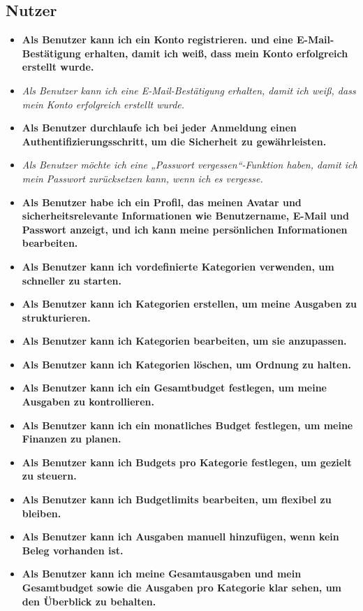 \documentclass[12pt,a4paper]{article}
\newcommand{\doing}[1]{\textbf{{#1}}}
\newcommand{\maybe}[1]{\textit{\textcolor{MaybeColor}{#1}}}
\begin{document}
\subsection{Nutzer}
\begin{itemize}
    \item \doing {Als Benutzer kann ich ein Konto registrieren. und eine E-Mail-Bestätigung erhalten, damit ich weiß, dass mein Konto erfolgreich erstellt wurde.}
    \item \maybe {Als Benutzer kann ich eine E-Mail-Bestätigung erhalten, damit ich weiß, dass mein Konto erfolgreich erstellt wurde.}
    \item \doing {Als Benutzer durchlaufe ich bei jeder Anmeldung einen Authentifizierungsschritt, um die Sicherheit zu gewährleisten.}
    \item \maybe {Als Benutzer möchte ich eine „Passwort vergessen“-Funktion haben, damit ich mein Passwort zurücksetzen kann, wenn ich es vergesse.}
    \item \doing {Als Benutzer habe ich ein Profil, das meinen Avatar und sicherheitsrelevante Informationen wie Benutzername, E-Mail und Passwort anzeigt, und ich kann meine persönlichen Informationen bearbeiten.}
    \item \doing {Als Benutzer kann ich vordefinierte Kategorien verwenden, um schneller zu starten.}
    \item \doing {Als Benutzer kann ich Kategorien erstellen, um meine Ausgaben zu strukturieren.}
    \item \doing {Als Benutzer kann ich Kategorien bearbeiten, um sie anzupassen.}
    \item \doing {Als Benutzer kann ich Kategorien löschen, um Ordnung zu halten.}
    \item \doing {Als Benutzer kann ich ein Gesamtbudget festlegen, um meine Ausgaben zu kontrollieren.}
    \item \doing {Als Benutzer kann ich ein monatliches Budget festlegen, um meine Finanzen zu planen.}
    \item \doing {Als Benutzer kann ich Budgets pro Kategorie festlegen, um gezielt zu steuern.}
    \item \doing {Als Benutzer kann ich Budgetlimits bearbeiten, um flexibel zu bleiben.}
    \item \doing {Als Benutzer kann ich Ausgaben manuell hinzufügen, wenn kein Beleg vorhanden ist.}
    \item \doing {Als Benutzer kann ich meine Gesamtausgaben und mein Gesamtbudget sowie die Ausgaben pro Kategorie klar sehen, um den Überblick zu behalten.}

\end{itemize}
\end{document}
